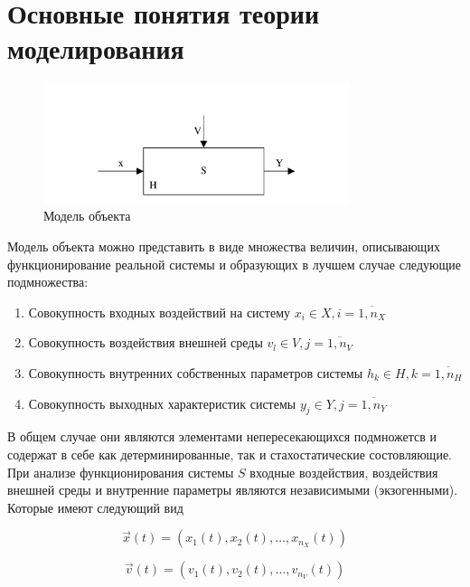 \section{Основные понятия теории моделирования}

\begin{figure}[H]
    \centering
    \includegraphics[width=0.8\textwidth]{img/content/05_general_modeling/scheme.pdf}
    \caption{Модель объекта}
    \label{fig:scheme}
\end{figure}

Модель объекта можно представить в виде множества величин, описывающих функционирование реальной системы и образующих в лучшем случае следующие подмножества:

\begin{enumerate}
    \item Совокупность входных воздействий на систему $x_i \in X, i = \overline{1, n_X}$
    \item Совокупность воздействия внешней среды $v_l \in V, j = \overline{1, n_V}$
    \item Совокупность внутренних собственных параметров системы $h_k \in H, k = \overline{1, n_H}$
    \item Совокупность выходных характеристик системы $y_j \in Y, j = \overline{1, n_Y}$
\end{enumerate}

В общем случае они являются элементами непересекающихся подмножетсв и содержат в себе как детерминированные, так и стахостатические состовляющие. При анализе функционирования системы $S$ входные воздействия, воздействия внешней среды и внутренние параметры являются независимыми (экзогенными). Которые имеют следующий вид

\begin{equation*}
    \vec x(t) = \left( x_1(t), x_2(t), \ldots, x_{n_X}(t) \right)
\end{equation*}

\begin{equation*}
    \vec v(t) = \left( v_1(t), v_2(t), \ldots, v_{n_V}(t) \right)
\end{equation*}


